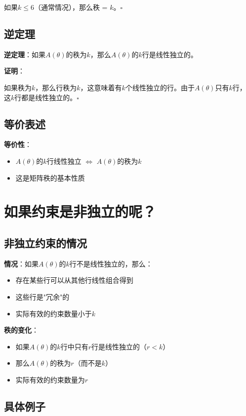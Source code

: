 \documentclass[12pt,a4paper]{article}
\begin{document}
如果$k \leq 6$（通常情况），那么秩 = $k$。$\square$

\subsection{逆定理}

\textbf{逆定理}：如果$A(\theta)$的秩为$k$，那么$A(\theta)$的$k$行是线性独立的。

\textbf{证明}：

如果秩为$k$，那么行秩为$k$，这意味着有$k$个线性独立的行。由于$A(\theta)$只有$k$行，这$k$行都是线性独立的。$\square$

\subsection{等价表述}

\textbf{等价性}：
\begin{itemize}
\item $A(\theta)$的$k$行线性独立 $\Leftrightarrow$ $A(\theta)$的秩为$k$
\item 这是矩阵秩的基本性质
\end{itemize}

\section{如果约束是非独立的呢？}

\subsection{非独立约束的情况}

\textbf{情况}：如果$A(\theta)$的$k$行不是线性独立的，那么：
\begin{itemize}
\item 存在某些行可以从其他行线性组合得到
\item 这些行是"冗余"的
\item 实际有效的约束数量小于$k$
\end{itemize}

\textbf{秩的变化}：
\begin{itemize}
\item 如果$A(\theta)$的$k$行中只有$r$行是线性独立的（$r < k$）
\item 那么$A(\theta)$的秩为$r$（而不是$k$）
\item 实际有效的约束数量为$r$
\end{itemize}

\subsection{具体例子}
\end{document}

